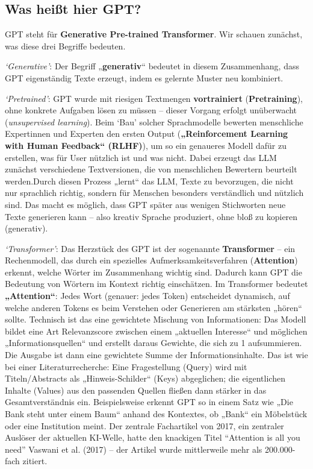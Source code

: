 \documentclass[
  ngerman,
  letterpaper,
  DIV=11]{scrreprt}
\begin{document}
\subsection{Was heißt hier GPT?}\label{sec-gpt-bedeutung}

GPT steht für \textbf{Generative Pre-trained Transformer}. Wir schauen
zunächst, was diese drei Begriffe bedeuten.

\emph{`Generative'}: Der Begriff „\textbf{generativ}`` bedeutet in
diesem Zusammenhang, dass GPT eigenständig Texte erzeugt, indem es
gelernte Muster neu kombiniert.

\emph{`Pretrained'}: GPT wurde mit riesigen Textmengen
\textbf{vortrainiert} (\textbf{Pretraining}), ohne konkrete Aufgaben
lösen zu müssen -- dieser Vorgang erfolgt unüberwacht
(\emph{unsupervised learning}). Beim `Bau' solcher Sprachmodelle
bewerten menschliche Expertinnen und Experten den ersten Output
(\textbf{„Reinforcement Learning with Human Feedback`` (RLHF)}), um so
ein genaueres Modell dafür zu erstellen, was für User nützlich ist und
was nicht. Dabei erzeugt das LLM zunächst verschiedene Textversionen,
die von menschlichen Bewertern beurteilt werden.Durch diesen Prozess
„lernt`` das LLM, Texte zu bevorzugen, die nicht nur sprachlich richtig,
sondern für Menschen besonders verständlich und nützlich sind. Das macht
es möglich, dass GPT später aus wenigen Stichworten neue Texte
generieren kann -- also kreativ Sprache produziert, ohne bloß zu
kopieren (generativ).

\emph{`Transformer'}: Das Herzstück des GPT ist der sogenannte
\textbf{Transformer} -- ein Rechenmodell, das durch ein spezielles
Aufmerksamkeitsverfahren (\textbf{Attention}) erkennt, welche Wörter im
Zusammenhang wichtig sind. Dadurch kann GPT die Bedeutung von Wörtern im
Kontext richtig einschätzen. Im Transformer bedeutet
\textbf{„Attention``}: Jedes Wort (genauer: jedes Token) entscheidet
dynamisch, auf welche anderen Tokens es beim Verstehen oder Generieren
am stärksten „hören`` sollte. Technisch ist das eine gewichtete Mischung
von Informationen: Das Modell bildet eine Art Relevanzscore zwischen
einem „aktuellen Interesse`` und möglichen „Informationsquellen`` und
erstellt daraus Gewichte, die sich zu 1 aufsummieren. Die Ausgabe ist
dann eine gewichtete Summe der Informationsinhalte. Das ist wie bei
einer Literaturrecherche: Eine Fragestellung (Query) wird mit
Titeln/Abstracts als „Hinweis-Schilder`` (Keys) abgeglichen; die
eigentlichen Inhalte (Values) aus den passenden Quellen fließen dann
stärker in das Gesamtverständnis ein. Beispielsweise erkennt GPT so in
einem Satz wie „Die Bank steht unter einem Baum`` anhand des Kontextes,
ob „Bank`` ein Möbelstück oder eine Institution meint. Der zentrale
Fachartikel von 2017, ein zentraler Auslöser der aktuellen KI-Welle,
hatte den knackigen Titel ``Attention is all you need'' Vaswani et al.
(2017) -- der Artikel wurde mittlerweile mehr als 200.000-fach zitiert.
\end{document}
